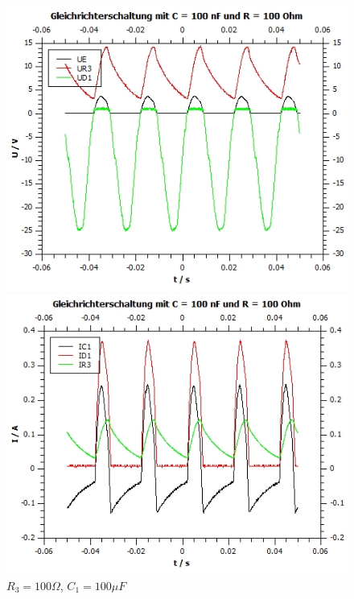 \documentclass[12pt,a4paper,twoside]{article}
\begin{document}
\begin{figure}[H]
    \begin{minipage}[b]{.5\linewidth} %
        \includegraphics[width=1\linewidth]{nudes/Aufgabe 3 plots/100 ohm 100 uf U.jpg}
        \caption{$R_3 = 100 \Omega$, $C_1 = 100 \mu F$}
    \end{minipage}
    \hspace{0.01\linewidth}%
    \begin{minipage}[b]{.5\linewidth} %
        \includegraphics[width=1\linewidth]{nudes/Aufgabe 3 plots/100 ohm 100 uf I.jpg}
    \caption{$R_3 = 100 \Omega$, $C_1 = 100 \mu F$}
    \end{minipage}
\end{figure}
\end{document}
